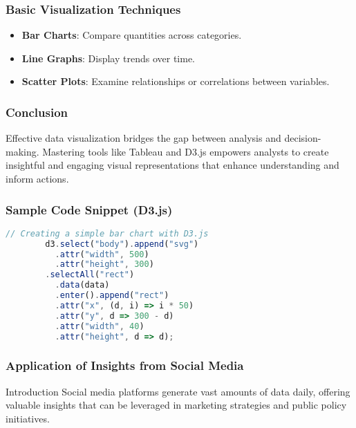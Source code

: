 \documentclass{beamer}
\begin{document}
\begin{frame}[fragile]
    \frametitle{Basic Visualization Techniques}
    \begin{itemize}
        \item \textbf{Bar Charts}: Compare quantities across categories.
        \item \textbf{Line Graphs}: Display trends over time.
        \item \textbf{Scatter Plots}: Examine relationships or correlations between variables.
    \end{itemize}
\end{frame}

\begin{frame}[fragile]
    \frametitle{Conclusion}
    Effective data visualization bridges the gap between analysis and decision-making. Mastering tools like Tableau and D3.js empowers analysts to create insightful and engaging visual representations that enhance understanding and inform actions.
\end{frame}

\begin{frame}[fragile]
    \frametitle{Sample Code Snippet (D3.js)}
    \begin{lstlisting}[language=JavaScript]
        // Creating a simple bar chart with D3.js
        d3.select("body").append("svg")
          .attr("width", 500)
          .attr("height", 300)
        .selectAll("rect")
          .data(data)
          .enter().append("rect")
          .attr("x", (d, i) => i * 50)
          .attr("y", d => 300 - d)
          .attr("width", 40)
          .attr("height", d => d);
    \end{lstlisting}
\end{frame}

\begin{frame}[fragile]
    \frametitle{Application of Insights from Social Media}
    \begin{block}{Introduction}
        Social media platforms generate vast amounts of data daily, offering valuable insights that can be leveraged in marketing strategies and public policy initiatives.
    \end{block}
\end{frame}
\end{document}
